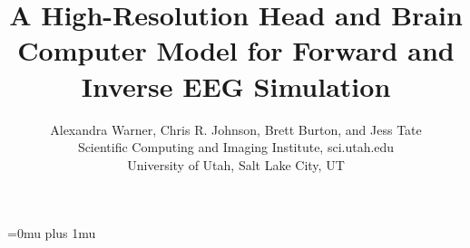 \documentclass[11pt]{article}
\begin{document}
\title{A High-Resolution Head and Brain Computer Model for Forward and Inverse EEG Simulation}
\author{Alexandra Warner, Chris R. Johnson, Brett Burton, and Jess Tate \\
Scientific Computing and Imaging Institute, sci.utah.edu\\
 University of Utah, Salt Lake City, UT\\}
\maketitle








\Urlmuskip=0mu plus 1mu\relax




\end{document}
